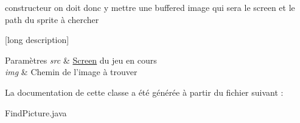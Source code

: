 constructeur on doit donc y mettre une buffered image qui sera le screen et le path du sprite à chercher 

\mbox{[}long description\mbox{]}


\begin{DoxyParams}{Paramètres}
{\em src} & \hyperlink{classScreen}{Screen} du jeu en cours \\
\hline
{\em img} & Chemin de l'image à trouver \\
\hline
\end{DoxyParams}


La documentation de cette classe a été générée à partir du fichier suivant \+:\begin{DoxyCompactItemize}
\item 
Find\+Picture.\+java\end{DoxyCompactItemize}
